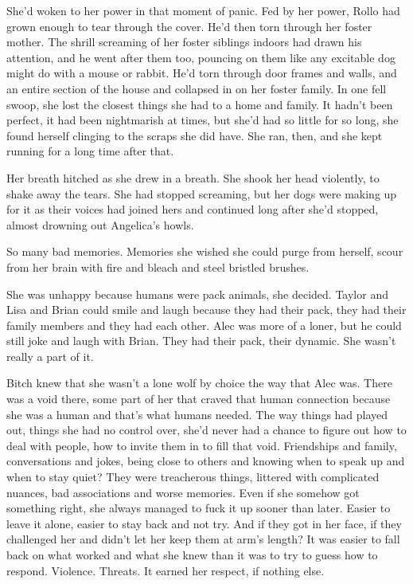 She'd woken to her power in that moment of panic.  Fed by her power, Rollo had grown enough to tear through the cover.  He'd then torn through her foster mother.  The shrill screaming of her foster siblings indoors had drawn his attention, and he went after them too, pouncing on them like any excitable dog might do with a mouse or rabbit.  He'd torn through door frames and walls, and an entire section of the house and collapsed in on her foster family.  In one fell swoop, she lost the closest things she had to a home and family.  It hadn't been perfect, it had been nightmarish at times, but she'd had so little for so long, she found herself clinging to the scraps she did have.  She ran, then, and she kept running for a long time after that.



Her breath hitched as she drew in a breath.  She shook her head violently, to shake away the tears.  She had stopped screaming, but her dogs were making up for it as their voices had joined hers and continued long after she'd stopped, almost drowning out Angelica's howls.



So many bad memories.  Memories she wished she could purge from herself, scour from her brain with fire and bleach and steel bristled brushes.



She was unhappy because humans were pack animals, she decided.  Taylor and Lisa and Brian could smile and laugh because they had their pack, they had their family members and they had each other.  Alec was more of a loner, but he could still joke and laugh with Brian.  They had their pack, their dynamic.  She wasn't really a part of it.



Bitch knew that she wasn't a lone wolf by choice the way that Alec was.  There was a void there, some part of her that craved that human connection because she was a human and that's what humans needed.  The way things had played out, things she had no control over, she'd never had a chance to figure out how to deal with people, how to invite them in to fill that void.  Friendships and family, conversations and jokes, being close to others and knowing when to speak up and when to stay quiet?  They were treacherous things, littered with complicated nuances, bad associations and worse memories.  Even if she somehow got something right, she always managed to fuck it up sooner than later.  Easier to leave it alone, easier to stay back and not try.  And if they got in her face, if they challenged her and didn't let her keep them at arm's length?  It was easier to fall back on what worked and what she knew than it was to try to guess how to respond.  Violence.  Threats.  It earned her respect, if nothing else.



